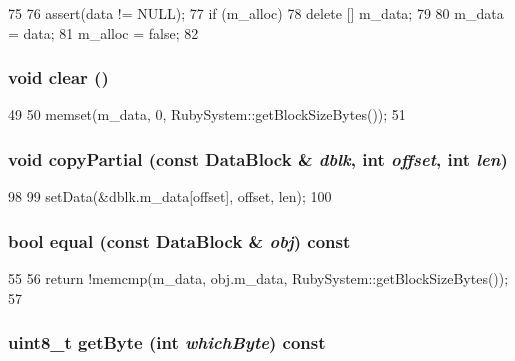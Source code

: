 \begin{DoxyCode}
75 {
76     assert(data != NULL);
77     if (m_alloc) {
78         delete [] m_data;
79     }
80     m_data = data;
81     m_alloc = false;
82 }
\end{DoxyCode}
\hypertarget{classDataBlock_ac8bb3912a3ce86b15842e79d0b421204}{
\subsubsection[{clear}]{\setlength{\rightskip}{0pt plus 5cm}void clear ()}}
\label{classDataBlock_ac8bb3912a3ce86b15842e79d0b421204}



\begin{DoxyCode}
49 {
50     memset(m_data, 0, RubySystem::getBlockSizeBytes());
51 }
\end{DoxyCode}
\hypertarget{classDataBlock_a6ba9e3f9a391e9a177f270b59fe6f925}{
\subsubsection[{copyPartial}]{\setlength{\rightskip}{0pt plus 5cm}void copyPartial (const {\bf DataBlock} \& {\em dblk}, \/  int {\em offset}, \/  int {\em len})}}
\label{classDataBlock_a6ba9e3f9a391e9a177f270b59fe6f925}



\begin{DoxyCode}
98 {
99     setData(&dblk.m_data[offset], offset, len);
100 }
\end{DoxyCode}
\hypertarget{classDataBlock_ae37d94507baba0d67be51551a08b2e67}{
\subsubsection[{equal}]{\setlength{\rightskip}{0pt plus 5cm}bool equal (const {\bf DataBlock} \& {\em obj}) const}}
\label{classDataBlock_ae37d94507baba0d67be51551a08b2e67}



\begin{DoxyCode}
55 {
56     return !memcmp(m_data, obj.m_data, RubySystem::getBlockSizeBytes());
57 }
\end{DoxyCode}
\hypertarget{classDataBlock_a4cd8bb493e935c5c1907d2c92358bfaa}{
\subsubsection[{getByte}]{\setlength{\rightskip}{0pt plus 5cm}uint8\_\-t getByte (int {\em whichByte}) const}}
\label{classDataBlock_a4cd8bb493e935c5c1907d2c92358bfaa}



